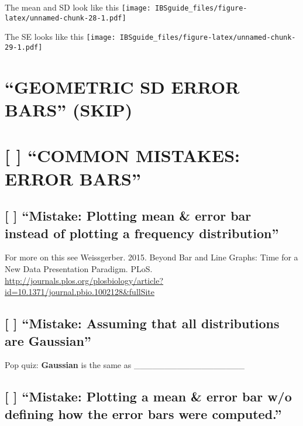 \documentclass[]{book}
\theoremstyle{definition}
\theoremstyle{definition}
\theoremstyle{definition}
\theoremstyle{remark}
\begin{document}
The mean and SD look like this
\texttt{[image: IBSguide\_files/figure-latex/unnamed-chunk-28-1.pdf]}

The SE looks like this
\texttt{[image: IBSguide\_files/figure-latex/unnamed-chunk-29-1.pdf]}

\section{\texorpdfstring{``GEOMETRIC SD ERROR BARS''
(SKIP)}{GEOMETRIC SD ERROR BARS (SKIP)}}\label{geometric-sd-error-bars-skip}

\section{\texorpdfstring{{[} {]} ``COMMON MISTAKES: ERROR
BARS''}{{[} {]} COMMON MISTAKES: ERROR BARS}}\label{common-mistakes-error-bars}

\subsection{\texorpdfstring{{[} {]} ``Mistake: Plotting mean \& error
bar instead of plotting a frequency
distribution''}{{[} {]} Mistake: Plotting mean \& error bar instead of plotting a frequency distribution}}\label{mistake-plotting-mean-error-bar-instead-of-plotting-a-frequency-distribution}

For more on this see Weissgerber. 2015. Beyond Bar and Line Graphs: Time
for a New Data Presentation Paradigm. PLoS.
\url{http://journals.plos.org/plosbiology/article?id=10.1371/journal.pbio.1002128\&fullSite}

\subsection{\texorpdfstring{{[} {]} ``Mistake: Assuming that all
distributions are
Gaussian''}{{[} {]} Mistake: Assuming that all distributions are Gaussian}}\label{mistake-assuming-that-all-distributions-are-gaussian}

Pop quiz: \textbf{Gaussian} is the same as
\_\_\_\_\_\_\_\_\_\_\_\_\_\_\_\_\_\_

\subsection{\texorpdfstring{{[} {]} ``Mistake: Plotting a mean \& error
bar w/o defining how the error bars were
computed.''}{{[} {]} Mistake: Plotting a mean \& error bar w/o defining how the error bars were computed.}}\label{mistake-plotting-a-mean-error-bar-wo-defining-how-the-error-bars-were-computed.}
\end{document}
